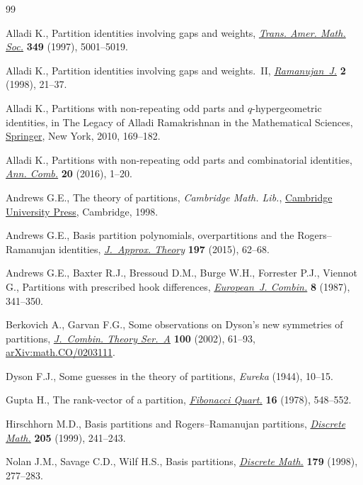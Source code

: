 \documentclass[10pt,a4paper]{amsart}
\numberwithin{equation}{section}
\theoremstyle{definition}
\begin{document}
\begin{thebibliography}{99}
\footnotesize\itemsep=0pt

Alladi K., Partition identities involving gaps and weights,
 \href{https://doi.org/10.1090/S0002-9947-97-01831-X}{\textit{Trans. Amer.
 Math. Soc.}} \textbf{349} (1997), 5001--5019.

Alladi K., Partition identities involving gaps and weights.~{II},
 \href{https://doi.org/10.1023/A:1009749606406}{\textit{Ramanujan~J.}}
 \textbf{2} (1998), 21--37.

Alladi K., Partitions with non-repeating odd parts and {$q$}-hypergeometric
 identities, in The Legacy of {A}lladi {R}amakrishnan in the Mathematical
 Sciences, \href{https://doi.org/10.1007/978-1-4419-6263-8_9}{Springer}, New
 York, 2010, 169--182.

Alladi K., Partitions with non-repeating odd parts and combinatorial
 identities, \href{https://doi.org/10.1007/s00026-015-0291-8}{\textit{Ann.
 Comb.}} \textbf{20} (2016), 1--20.

Andrews G.E., The theory of partitions, \textit{Cambridge Math. Lib.},
 \href{https://doi.org/10.1017/CBO9780511608650}{Cambridge University Press},
 Cambridge, 1998.

Andrews G.E., Basis partition polynomials, overpartitions and the
 {R}ogers--{R}amanujan identities,
 \href{https://doi.org/10.1016/j.jat.2014.05.008}{\textit{J.~Approx. Theory}}
 \textbf{197} (2015), 62--68.

Andrews G.E., Baxter R.J., Bressoud D.M., Burge W.H., Forrester P.J., Viennot
 G., Partitions with prescribed hook differences,
 \href{https://doi.org/10.1016/S0195-6698(87)80041-0}{\textit{European~J. Combin.}} \textbf{8} (1987), 341--350.

Berkovich A., Garvan F.G., Some observations on {D}yson's new symmetries of
 partitions, \href{https://doi.org/10.1006/jcta.2002.3281}{\textit{J.~Combin.
 Theory Ser.~A}} \textbf{100} (2002), 61--93,
 \href{http://arxiv.org/abs/math.CO/0203111}{arXiv:math.CO/0203111}.

Dyson F.J., Some guesses in the theory of partitions, \textit{Eureka} (1944),
 10--15.

Gupta H., The rank-vector of a partition,
 \href{https://doi.org/10.1080/00150517.1978.12430283}{\textit{Fibonacci
 Quart.}} \textbf{16} (1978), 548--552.

Hirschhorn M.D., Basis partitions and {R}ogers--{R}amanujan partitions,
 \href{https://doi.org/10.1016/S0012-365X(99)00030-8}{\textit{Discrete Math.}}
 \textbf{205} (1999), 241--243.

Nolan J.M., Savage C.D., Wilf H.S., Basis partitions,
 \href{https://doi.org/10.1016/S0012-365X(97)00101-5}{\textit{Discrete Math.}}
 \textbf{179} (1998), 277--283.

\end{thebibliography}
\end{document}
